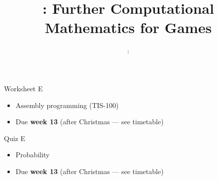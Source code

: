 \usepackage{../../beamerthemeFalmouthGamesAcademy}
\usepackage{multimedia}
\graphicspath{ {../../} }

\lstset{language=Python
}

\usepackage[normalem]{ulem}
\usepackage{wasysym}

\usepackage{algpseudocode}

\usepackage{pdfpages}

\usetikzlibrary{arrows,automata}
\usetikzlibrary{tikzmark,calc}




\title{\sessionnumber: Further Computational Mathematics for Games}
\subtitle{\modulecode: \moduletitle}

\frame{\titlepage} 


\begin{frame}{Worksheet E}
	\begin{itemize}
		\item Assembly programming (TIS-100)
		\item Due \textbf{week 13} (after Christmas --- see timetable)
	\end{itemize}
\end{frame}

\begin{frame}{Quiz E}
	\begin{itemize}
		\item Probability
		\item Due \textbf{week 13} (after Christmas --- see timetable)
	\end{itemize}
\end{frame}

